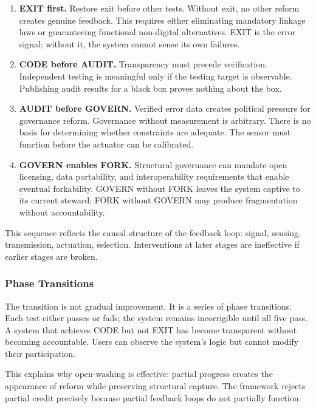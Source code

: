 \begin{enumerate}
    \item \textbf{EXIT first.} Restore exit before other tests. Without exit, no other reform creates genuine feedback. This requires either eliminating mandatory linkage laws or guaranteeing functional non-digital alternatives. EXIT is the error signal; without it, the system cannot sense its own failures.

    \item \textbf{CODE before AUDIT.} Transparency must precede verification. Independent testing is meaningful only if the testing target is observable. Publishing audit results for a black box proves nothing about the box.

    \item \textbf{AUDIT before GOVERN.} Verified error data creates political pressure for governance reform. Governance without measurement is arbitrary. There is no basis for determining whether constraints are adequate. The sensor must function before the actuator can be calibrated.

    \item \textbf{GOVERN enables FORK.} Structural governance can mandate open licensing, data portability, and interoperability requirements that enable eventual forkability. GOVERN without FORK leaves the system captive to its current steward; FORK without GOVERN may produce fragmentation without accountability.
\end{enumerate}

This sequence reflects the causal structure of the feedback loop: signal, sensing, transmission, actuation, selection. Interventions at later stages are ineffective if earlier stages are broken.

\subsubsection{Phase Transitions}

The transition is not gradual improvement. It is a series of phase transitions. Each test either passes or fails; the system remains incorrigible until all five pass. A system that achieves CODE but not EXIT has become transparent without becoming accountable. Users can observe the system's logic but cannot modify their participation.

This explains why open-washing is effective: partial progress creates the appearance of reform while preserving structural capture. The framework rejects partial credit precisely because partial feedback loops do not partially function.

